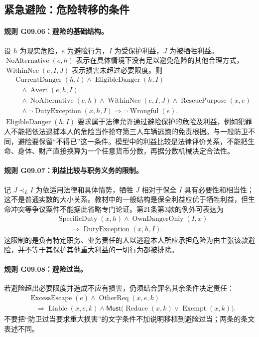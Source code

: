 \subsection{紧急避险：危险转移的条件}
\paragraph{规则 G09.06：避险的基础结构。}
设 $h$ 为现实危险，$e$ 为避险行为，$I$ 为受保护利益，$J$ 为被牺牲利益。$\operatorname{NoAlternative}(e,h)$ 表示在具体情境下没有足以避免危险的其他合理方式，$\operatorname{WithinNec}(e,I,J)$ 表示损害未超过必要限度。则
\[
\begin{aligned}
&\operatorname{CurrentDanger}(h,t)\land\operatorname{EligibleDanger}(h,I)\\
&\quad\land\operatorname{Avert}(e,h,I)\\
&\quad\land\operatorname{NoAlternative}(e,h)
\land\operatorname{WithinNec}(e,I,J)\land\operatorname{RescuePurpose}(x,e)\\
&\quad\land\neg\operatorname{DutyException}(x,h,I)
\Longrightarrow\neg\operatorname{Wrongful}(e).
\end{aligned}
\]
$\operatorname{EligibleDanger}(h,I)$ 要求属于法律允许通过避险保护的危险及利益，例如犯罪人不能把依法逮捕本人的危险当作抢夺第三人车辆逃跑的免责根据。与一般防卫不同，避险要保留“不得已”这一条件。模型中的利益比较是法律评价关系，不能把生命、身体、财产直接换算为一个任意货币分数，再据分数机械决定合法性。

\paragraph{规则 G09.07：利益比较与职务义务的限制。}
记 $J\prec_L I$ 为依适用法律和具体情势，牺牲 $J$ 相对于保全 $I$ 具有必要性和相当性；这不是普通实数的大小关系。教材中的一般结构是保全利益应优于牺牲利益，但生命冲突等争议案件不能据此省略专门论证。第21条第3款的例外可表达为
\[
\begin{aligned}
&\operatorname{SpecificDuty}(x,h)\land\operatorname{OwnDangerOnly}(I,x)\\
&\qquad\Longrightarrow\operatorname{DutyException}(x,h,I).
\end{aligned}
\]
这限制的是负有特定职务、业务责任的人以逃避本人所应承担危险为由主张该款避险，并不等于其保护其他重大利益的一切行为都被排除。

\paragraph{规则 G09.08：避险过当。}
若避险超出必要限度并造成不应有损害，仍须结合罪名其余条件决定责任：
\[
\begin{aligned}
&\operatorname{ExcessEscape}(e)\land\operatorname{OtherReq}(x,e,k)\\
&\quad\Longrightarrow\operatorname{Liable}(x,e,k)
\land\mathsf{Must}\bigl(\operatorname{Reduce}(x,k)\lor\operatorname{Exempt}(x,k)\bigr).
\end{aligned}
\]
不要把“防卫过当要求重大损害”的文字条件不加说明移植到避险过当；两条的条文表述不同。

